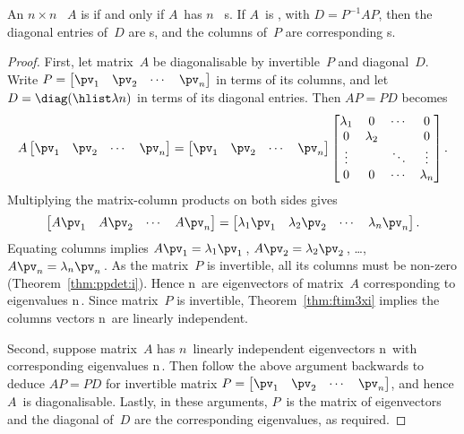 \begin{theorem} \label{thm:gendiag} 
An \(n\times n\) ~\(A\) is  if and only if \(A\)~has \(n\)~ s.  
If \(A\)~is , with  \(D=P^{-1}AP\), then  the diagonal entries of~\(D\) are s, and the columns of~\(P\) are corresponding s.
\end{theorem}
\begin{proof} 
First, let matrix~\(A\) be diagonalisable by invertible~\(P\) and diagonal~\(D\).
Write \(P=\begin{bmatrix} \pv_1&\pv_2&\cdots&\pv_n \end{bmatrix}\) in terms of its columns, and let \(D=\diag(\hlist\lambda n)\) in terms of its diagonal entries.
Then \(AP=PD\) becomes
\begin{equation*}
A\begin{bmatrix} \pv_1&\pv_2&\cdots&\pv_n \end{bmatrix}
=\begin{bmatrix} \pv_1&\pv_2&\cdots&\pv_n \end{bmatrix}
\begin{bmatrix} \lambda_1&0&\cdots&0\\
0&\lambda_2&&0\\
\vdots&&\ddots&\vdots\\
0&0&\cdots&\lambda_n \end{bmatrix}.
\end{equation*}
Multiplying the matrix-column products on both sides gives
\begin{equation*}
\begin{bmatrix} A\pv_1&A\pv_2&\cdots&A\pv_n \end{bmatrix}
=\begin{bmatrix} \lambda_1\pv_1& \lambda_2\pv_2&\cdots& \lambda_n\pv_n \end{bmatrix}.
\end{equation*}
Equating columns implies \(A\pv_1=\lambda_1\pv_1\)\,, \(A\pv_2=\lambda_2\pv_2\)\,, \ldots, \(A\pv_n=\lambda_n\pv_n\)\,.
As the matrix~\(P\) is invertible, all its columns must be non-zero (Theorem~\ref{thm:ppdet:i}).
Hence \hlist\pv n\ are eigenvectors of matrix~\(A\) corresponding to eigenvalues \hlist\lambda n\,.
Since matrix~\(P\) is invertible, Theorem~\ref{thm:ftim3xi} implies the columns vectors \hlist\pv n\ are linearly independent.

Second, suppose matrix~\(A\) has \(n\)~{linearly independent} {eigenvector}s \hlist\pv n\ with corresponding eigenvalues \hlist\lambda n\,.  
Then follow the above argument backwards to deduce \(AP=PD\) for invertible matrix \(P=\begin{bmatrix} \pv_1&\pv_2&\cdots&\pv_n \end{bmatrix}\), and hence \(A\)~is diagonalisable.
Lastly, in these arguments, \(P\)~is the matrix of eigenvectors and the diagonal of~\(D\) are the corresponding eigenvalues, as required.
\end{proof}


